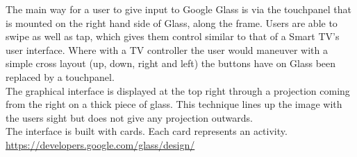 The main way for a user to give input to Google Glass is via the touchpanel that is mounted on the right hand side of Glass, along the frame. Users are able to swipe as well as tap, which gives them control similar to that of a Smart TV's user interface. Where with a TV controller the user would maneuver with a simple cross layout (up, down, right and left) the buttons have on Glass been replaced by a touchpanel.\\


The graphical interface is displayed at the top right through a projection coming from the right on a thick piece of glass. This technique lines up the image with the users sight but does not give any projection outwards.\\

The interface is built with cards. Each card represents an activity.\\

\url{https://developers.google.com/glass/design/}